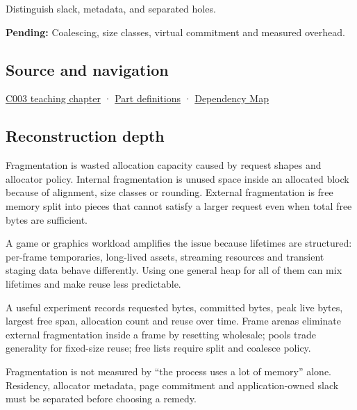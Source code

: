 Distinguish slack, metadata, and separated holes.

\textbf{Pending:} Coalescing, size classes, virtual commitment and measured overhead.

\subsection{Source and navigation}\label{appendix-a7c50686d81f-source-and-navigation}

\hyperref[01-foundations-i-ch002-where-the-bytes-live]{C003 teaching chapter} · \hyperref[appendix-fd090d982a15-m003---parts-41-60]{Part definitions} · \hyperref[appendix-4ad47bdd269a]{Dependency Map}

\subsection{Reconstruction depth}\label{appendix-a7c50686d81f-reconstruction-depth}

Fragmentation is wasted allocation capacity caused by request shapes and allocator policy. Internal fragmentation is unused space inside an allocated block because of alignment, size classes or rounding. External fragmentation is free memory split into pieces that cannot satisfy a larger request even when total free bytes are sufficient.

A game or graphics workload amplifies the issue because lifetimes are structured: per-frame temporaries, long-lived assets, streaming resources and transient staging data behave differently. Using one general heap for all of them can mix lifetimes and make reuse less predictable.

A useful experiment records requested bytes, committed bytes, peak live bytes, largest free span, allocation count and reuse over time. Frame arenas eliminate external fragmentation inside a frame by resetting wholesale; pools trade generality for fixed-size reuse; free lists require split and coalesce policy.

Fragmentation is not measured by ``the process uses a lot of memory'' alone. Residency, allocator metadata, page commitment and application-owned slack must be separated before choosing a remedy.
